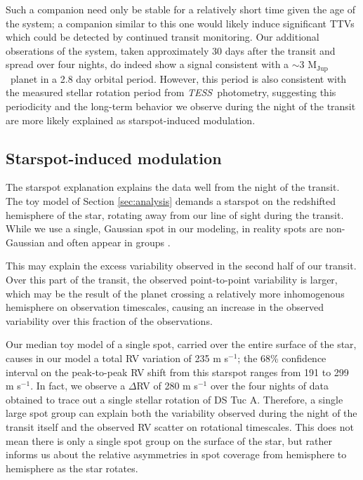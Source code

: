\documentclass[twocolumn]{aastex63}
\newcommand{\tess}{{\it TESS}}
\newcommand{\mjup}{{M$_\textrm{Jup}$}}
\begin{document}
Such a companion need only be stable for a relatively short time given the age of the system; a companion similar to this one would likely induce significant TTVs which could be detected by continued transit monitoring.
Our additional obserations of the system, taken approximately 30 days after the transit and spread over four nights, do indeed show a signal consistent with a $\sim 3$ \mjup\ planet in a 2.8 day orbital period. However, this period is also consistent with the measured stellar rotation period from \tess\ photometry, suggesting this periodicity and the long-term behavior we observe during the night of the transit are more likely explained as starspot-induced modulation.



\subsection{Starspot-induced modulation}

The starspot explanation explains the data well from the night of the transit.
The toy model of Section \ref{sec:analysis} demands a starspot on the redshifted hemisphere of the star, rotating away from our line of sight during the transit. 
While we use a single, Gaussian spot in our modeling, in reality spots are non-Gaussian and often appear in groups \citep[e.g.][]{Kilcik11}.

This may explain the excess variability observed in the second half of our transit. 
Over this part of the transit, the observed point-to-point variability is larger, which may be the result of the planet crossing a relatively more inhomogenous hemisphere on observation timescales, causing an increase in the observed variability over this fraction of the observations.

Our median toy model of a single spot, carried over the entire surface of the star, causes in our model a total RV variation of 235 m s$^{-1}$; the 68\% confidence interval on the peak-to-peak RV shift from this starspot ranges from 191 to 299 m s$^{-1}$.
In fact, we observe a $\Delta$RV of 280 m s$^{-1}$ over the four nights of data obtained to trace out a single stellar rotation of DS Tuc A.
Therefore, a single large spot group can explain both the variability observed during the night of the transit itself and the observed RV scatter on rotational timescales.
This does not mean there is only a single spot group on the surface of the star, but rather informs us about the relative asymmetries in spot coverage from hemisphere to hemisphere as the star rotates.
\end{document}
